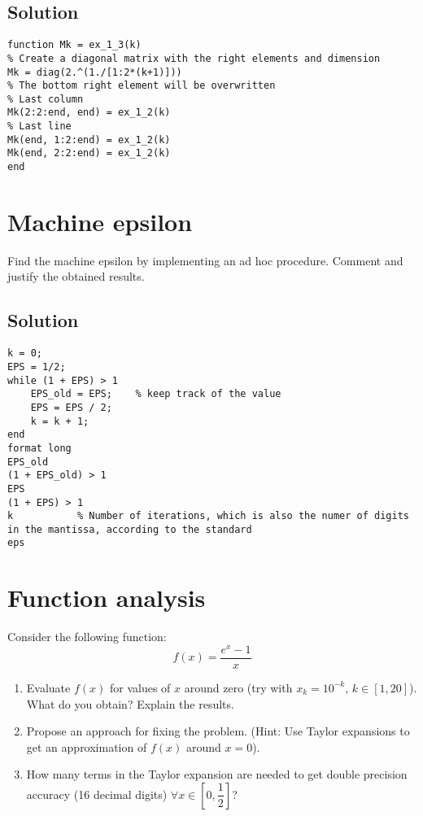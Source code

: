 \documentclass[12pt, a4paper]{report}
\begin{document}
    \subsection*{Solution}
        \begin{lstlisting}[style=Matlab]
function Mk = ex_1_3(k)
% Create a diagonal matrix with the right elements and dimension
Mk = diag(2.^(1./[1:2*(k+1)]))
% The bottom right element will be overwritten
% Last column
Mk(2:2:end, end) = ex_1_2(k)
% Last line
Mk(end, 1:2:end) = ex_1_2(k)
Mk(end, 2:2:end) = ex_1_2(k)
end
        \end{lstlisting}

    \newpage

    \section{Machine epsilon}
        Find the machine epsilon by implementing an ad hoc procedure. Comment and justify the obtained results.
    \subsection*{Solution}
        \begin{lstlisting}[style=Matlab]
k = 0;
EPS = 1/2;
while (1 + EPS) > 1
    EPS_old = EPS;    % keep track of the value
    EPS = EPS / 2;
    k = k + 1;
end
format long
EPS_old		
(1 + EPS_old) > 1
EPS
(1 + EPS) > 1
k			% Number of iterations, which is also the numer of digits in the mantissa, according to the standard
eps			 
        \end{lstlisting}

    \newpage

    \section{Function analysis}
        Consider the following function:
        \[f(x)=\dfrac{e^x-1}{x}\]
        \begin{enumerate}
            \item Evaluate $f(x)$ for values of $x$ around zero (try with $x_k = 10^{-k}$, $k \in [1, 20]$). What do you obtain? Explain the results.
            \item Propose an approach for fixing the problem. (Hint: Use Taylor expansions to get an approximation of $f(x)$ around $x = 0$). 
            \item How many terms in the Taylor expansion are needed to get double precision accuracy (16 decimal digits) $\forall x \in \left[0, \dfrac{1}{2}\right]$?
        \end{enumerate}
\end{document}
